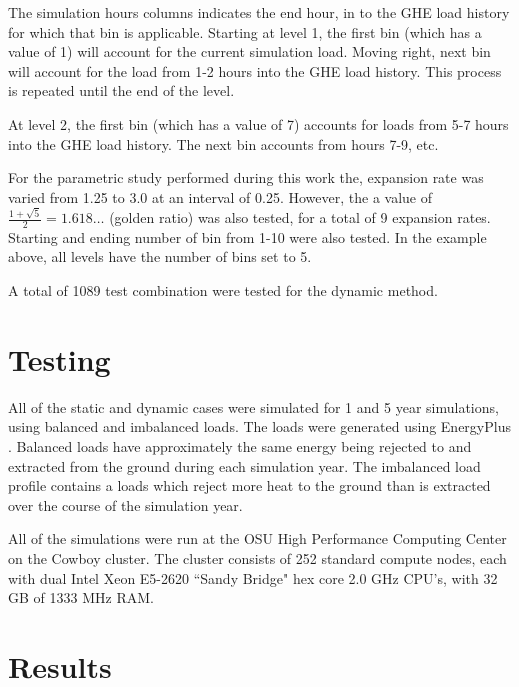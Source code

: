 \documentclass[review,12pt]{elsarticle}
\begin{document}
The simulation hours columns indicates the end hour, in to the GHE load history for which that bin is applicable. Starting at level 1, the first bin (which has a value of 1) will account for the current simulation load. Moving right, next bin will account for the load from 1-2 hours into the GHE load history. This process is repeated until the end of the level.

At level 2, the first bin (which has a value of 7) accounts for loads from 5-7 hours into the GHE load history. The next bin accounts from hours 7-9, etc.

For the parametric study performed during this work the, expansion rate was varied from 1.25 to 3.0 at an interval of 0.25. However, the a value of $\frac{1+\sqrt{5}}{2} = 1.618\ldots$ (golden ratio) was also tested, for a total of 9 expansion rates. Starting and ending number of bin from 1-10 were also tested. In the example above, all levels have the number of bins set to 5.

A total of 1089 test combination were tested for the dynamic method.

\section*{Testing}

All of the static and dynamic cases were simulated for 1 and 5 year simulations, using balanced and imbalanced loads. The loads were generated using EnergyPlus \citep{CRAWLEY2001319}. Balanced loads have approximately the same energy being rejected to and extracted from the ground during each simulation year. The imbalanced load profile contains a loads which reject more heat to the ground than is extracted over the course of the simulation year.

All of the simulations were run at the OSU High Performance Computing Center on the Cowboy cluster. The cluster consists of 252 standard compute nodes, each with dual Intel Xeon E5-2620 ``Sandy Bridge" hex core 2.0 GHz CPU's, with 32 GB of 1333 MHz RAM.

\section*{Results}
\end{document}
